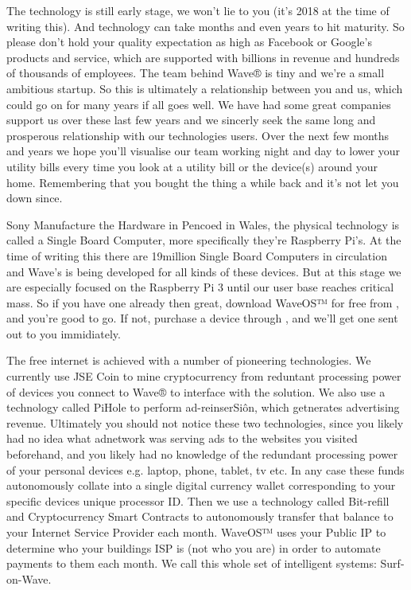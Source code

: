 \documentclass[letterpaper,10pt,english]{sphinxmanual}
\begin{document}
The technology is still early stage, we won’t lie to you (it’s 2018 at the time of writing this). And technology can take months and even years to hit maturity. So please don’t hold your quality expectation as high as Facebook or Google’s products and service, which are supported with billions in revenue and hundreds of thousands of employees. The team behind Wave® is tiny and we’re a small ambitious startup. So this is ultimately a relationship between you and us, which could go on for many years if all goes well. We have had some great companies support us over these last few years and we sincerly seek the same long and prosperous relationship with our technologies users. Over the next few months and years we hope you’ll visualise our team working night and day to lower your utility bills every time you look at a utility bill or the device(s) around your home. Remembering that you bought the thing a while back and it’s not let you down since.

Sony Manufacture the Hardware in Pencoed in Wales, the physical technology is called a Single Board Computer, more specifically they’re Raspberry Pi’s. At the time of writing this there are 19million Single Board Computers in circulation and Wave’s is being developed for all kinds of these devices. But at this stage we are especially focused on the Raspberry Pi 3 until our user base reaches critical mass. So if you have one already then great, download WaveOS™ for free from , and you’re good to go. If not, purchase a device through , and we’ll get one sent out to you immidiately.

The free internet is achieved with a number of pioneering technologies. We currently use JSE Coin to mine cryptocurrency from reduntant processing power of devices you connect to Wave® to interface with the solution. We also use a technology called PiHole to perform ad-reinserSiôn, which getnerates advertising revenue. Ultimately you should not notice these two technologies, since you likely had no idea what adnetwork was serving ads to the websites you visited beforehand, and you likely had no knowledge of the redundant processing power of your personal devices e.g. laptop, phone, tablet, tv etc. In any case these funds autonomously collate into a single digital currency wallet corresponding to your specific devices unique processor ID. Then we use a technology called Bit-refill and Cryptocurrency Smart Contracts to autonomously transfer that balance to your Internet Service Provider each month. WaveOS™ uses your Public IP to determine who your buildings ISP is (not who you are) in order to automate payments to them each month. We call this whole set of intelligent systems: Surf-on-Wave.
\end{document}
